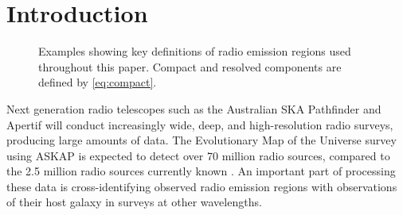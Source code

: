 \documentclass[fleqn,usenatbib,usedcolumn]{mnras}
\begin{document}

\section{Introduction}\label{introduction}

    \begin{figure}
        \centering
        \quad
        \quad
        \caption{\label{fig:definitions} Examples showing key definitions of radio emission regions used throughout this paper.
                 Compact and resolved components are defined by \autoref{eq:compact}.}
    \end{figure}

  Next generation radio telescopes such as the Australian SKA Pathfinder
  \citep[ASKAP;][]{johnston07} and Apertif \citep{verheijen08} will conduct
  increasingly wide, deep, and high-resolution radio surveys, producing large
  amounts of data. The Evolutionary Map of the Universe
  \citep[EMU;][]{norris11} survey using ASKAP is expected to detect over 70 million
  radio sources, compared to the 2.5 million radio sources currently
  known \citep{banfield15}. An important part of processing these data is cross-identifying observed
  radio emission regions with observations of their host galaxy in surveys at
  other wavelengths.
\end{document}
